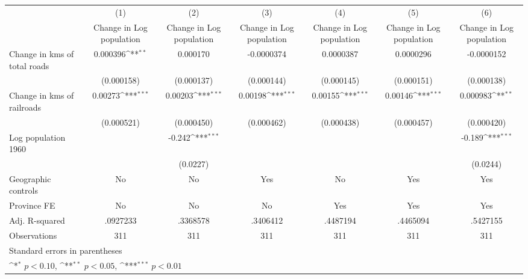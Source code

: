{
\def\sym#1{\ifmmode^{#1}\else\(^{#1}\)\fi}
\begin{tabular}{l*{6}{c}}
\hline\hline
                    &\multicolumn{1}{c}{(1)}&\multicolumn{1}{c}{(2)}&\multicolumn{1}{c}{(3)}&\multicolumn{1}{c}{(4)}&\multicolumn{1}{c}{(5)}&\multicolumn{1}{c}{(6)}\\
                    &\multicolumn{1}{c}{Change in Log population}&\multicolumn{1}{c}{Change in Log population}&\multicolumn{1}{c}{Change in Log population}&\multicolumn{1}{c}{Change in Log population}&\multicolumn{1}{c}{Change in Log population}&\multicolumn{1}{c}{Change in Log population}\\
\hline
Change in kms of total roads&    0.000396\sym{**} &    0.000170         &  -0.0000374         &   0.0000387         &   0.0000296         &  -0.0000152         \\
                    &  (0.000158)         &  (0.000137)         &  (0.000144)         &  (0.000145)         &  (0.000151)         &  (0.000138)         \\
[1em]
Change in kms of railroads&     0.00273\sym{***}&     0.00203\sym{***}&     0.00198\sym{***}&     0.00155\sym{***}&     0.00146\sym{***}&    0.000983\sym{**} \\
                    &  (0.000521)         &  (0.000450)         &  (0.000462)         &  (0.000438)         &  (0.000457)         &  (0.000420)         \\
[1em]
Log population 1960 &                     &      -0.242\sym{***}&                     &                     &                     &      -0.189\sym{***}\\
                    &                     &    (0.0227)         &                     &                     &                     &    (0.0244)         \\
\hline
Geographic controls &          No         &          No         &         Yes         &          No         &         Yes         &         Yes         \\
Province FE         &          No         &          No         &          No         &         Yes         &         Yes         &         Yes         \\
Adj. R-squared      &    .0927233         &    .3368578         &    .3406412         &    .4487194         &    .4465094         &    .5427155         \\
Observations        &         311         &         311         &         311         &         311         &         311         &         311         \\
\hline\hline
\multicolumn{7}{l}{\footnotesize Standard errors in parentheses}\\
\multicolumn{7}{l}{\footnotesize \sym{*} \(p<0.10\), \sym{**} \(p<0.05\), \sym{***} \(p<0.01\)}\\
\end{tabular}
}
